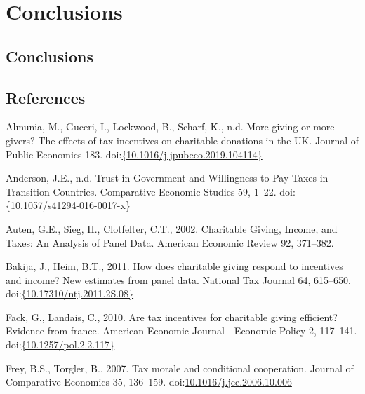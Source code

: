 \documentclass[ review  , 3p ]{elsarticle}
\begin{document}
  \hypertarget{conclusions}{%
  \section{Conclusions}\label{conclusions}}
  
  \hypertarget{conclusions-1}{%
  \subsection{Conclusions}\label{conclusions-1}}
  
  \clearpage
  
  \hypertarget{references}{%
  \subsection*{References}\label{references}}
  
  \hypertarget{refs}{}
  \leavevmode\hypertarget{ref-Almunia2020}{}%
  Almunia, M., Guceri, I., Lockwood, B., Scharf, K., n.d. More giving or more givers? The effects of tax incentives on charitable donations in the UK. Journal of Public Economics 183. doi:\href{https://doi.org/\%7B10.1016/j.jpubeco.2019.104114\%7D}{\{10.1016/j.jpubeco.2019.104114\}}
  
  \leavevmode\hypertarget{ref-Anderson2017}{}%
  Anderson, J.E., n.d. Trust in Government and Willingness to Pay Taxes in Transition Countries. Comparative Economic Studies 59, 1--22. doi:\href{https://doi.org/\%7B10.1057/s41294-016-0017-x\%7D}{\{10.1057/s41294-016-0017-x\}}
  
  \leavevmode\hypertarget{ref-Auten2002}{}%
  Auten, G.E., Sieg, H., Clotfelter, C.T., 2002. Charitable Giving, Income, and Taxes: An Analysis of Panel Data. American Economic Review 92, 371--382.
  
  \leavevmode\hypertarget{ref-Bakija2011}{}%
  Bakija, J., Heim, B.T., 2011. How does charitable giving respond to incentives and income? New estimates from panel data. National Tax Journal 64, 615--650. doi:\href{https://doi.org/\%7B10.17310/ntj.2011.2S.08\%7D}{\{10.17310/ntj.2011.2S.08\}}
  
  \leavevmode\hypertarget{ref-Fack2010}{}%
  Fack, G., Landais, C., 2010. Are tax incentives for charitable giving efficient? Evidence from france. American Economic Journal - Economic Policy 2, 117--141. doi:\href{https://doi.org/\%7B10.1257/pol.2.2.117\%7D}{\{10.1257/pol.2.2.117\}}
  
  \leavevmode\hypertarget{ref-Frey2007}{}%
  Frey, B.S., Torgler, B., 2007. Tax morale and conditional cooperation. Journal of Comparative Economics 35, 136--159. doi:\href{https://doi.org/10.1016/j.jce.2006.10.006}{10.1016/j.jce.2006.10.006}
  
\end{document}
